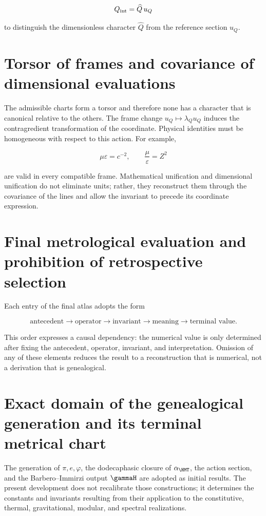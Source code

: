 \[
Q_{\rm int}=\widehat Q\,u_Q
\]

to distinguish the dimensionless character \(\widehat Q\) from the reference
section \(u_Q\).

\section{Torsor of frames and covariance of dimensional evaluations}

The admissible charts form a torsor and therefore none has a character that is canonical relative to the others. The frame change \(u_Q\mapsto\lambda_Q u_Q\) induces the contragredient transformation of the coordinate. Physical identities must be homogeneous with respect to this action. For example,

\[
\mu\varepsilon=c^{-2},\qquad \frac\mu\varepsilon=Z^2
\]

are valid in every compatible frame. Mathematical unification and
dimensional unification do not eliminate units; rather, they reconstruct them through the
covariance of the lines and allow the invariant to precede its coordinate
expression.

\section{Final metrological evaluation and prohibition of retrospective selection}

Each entry of the final atlas adopts the form

\begin{equation}
\boxed{\text{antecedent}\to\text{operator}\to\text{invariant}
\to\text{meaning}\to\text{terminal value}.}
\label{p3-83-c23-s1:eq:atlas-rule}
\end{equation}

This order expresses a causal dependency: the numerical value is only
determined after fixing the antecedent, operator, invariant, and
interpretation. Omission of any of these elements reduces the
result to a reconstruction that is numerical, not a derivation that is
genealogical.

\section{Exact domain of the genealogical generation and its terminal metrical chart}

The generation of
\(\pi,e,\varphi\), the dodecaphasic closure of \(\alpha_{\HMT}\),
the action section, and the Barbero--Immirzi output \(\gammaH\) are adopted as initial results. The
present development does not recalibrate those constructions; it determines the constants
and invariants resulting from their application to the constitutive,
thermal, gravitational, modular, and spectral realizations.

